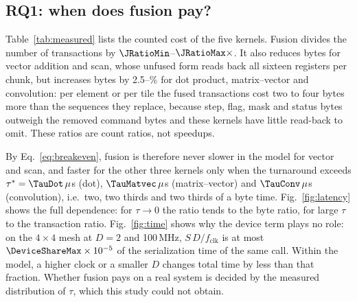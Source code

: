 \subsection{RQ1: when does fusion pay?}
\label{sec:rq1}

Table~\ref{tab:measured} lists the counted cost of the five kernels. Fusion
divides the number of transactions by $\JRatioMin$--$\JRatioMax\times$. It also reduces
bytes for vector addition and scan, whose unfused form reads back all
sixteen registers per chunk, but increases bytes by 2.5--\ByteIncreaseMax\%
for dot product, matrix--vector and convolution: per element or per tile the
fused transactions cost two to four bytes more than the sequences they
replace, because step, flag, mask and status bytes outweigh the removed
command bytes and these kernels have little read-back to omit. These
ratios are count ratios, not speedups.

By Eq.~\eqref{eq:breakeven}, fusion is therefore never slower in the model
for vector and scan, and faster for the other three kernels only when the
turnaround exceeds $\tau^{*}=\TauDot\,\mu$s (dot), $\TauMatvec\,\mu$s
(matrix--vector) and $\TauConv\,\mu$s (convolution), i.e.\ two, two thirds and
two thirds of a byte time. Fig.~\ref{fig:latency} shows the full dependence:
for $\tau\to0$ the ratio tends to the byte ratio, for large $\tau$ to the
transaction ratio. Fig.~\ref{fig:time} shows why the device term plays no
role: on the $4\times4$ mesh at $D=2$ and 100\,MHz, $S\,D/f_{\mathrm{clk}}$ is
at most $\DeviceShareMax\times10^{-5}$ of the serialization time of the same
call. Within the model, a higher clock or a smaller $D$ changes total time by
less than that fraction. Whether fusion pays on a real system is decided by
the measured distribution of $\tau$, which this study could not obtain.






